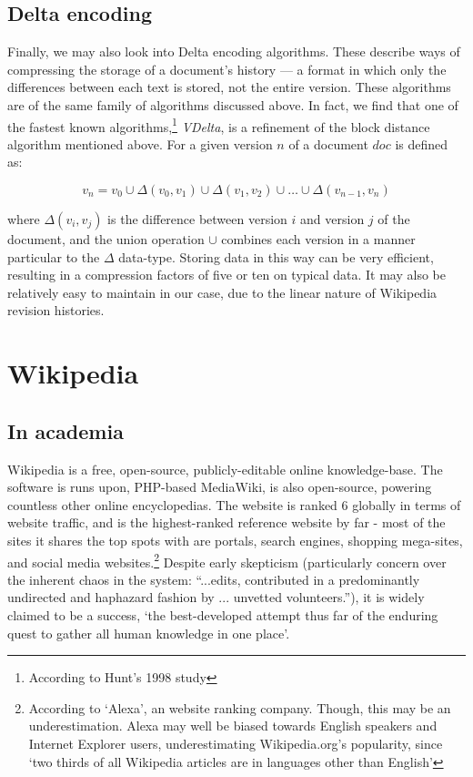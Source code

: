 \subsection*{Delta encoding}
Finally, we may also look into Delta encoding algorithms. These
describe ways of compressing the storage of a document's history --- a
format in which only the differences between each text is stored, not
the entire version. These algorithms are of the same family of
algorithms discussed above. In fact, we find that one of the fastest
known algorithms,\footnote{According to Hunt's 1998
  study\cite{Hunt1998}} \textit{VDelta}, is a refinement of the block
distance algorithm mentioned above. For a given version $n$ of a
document $doc$ is defined as:

$$v_n = v_0 \cup {\Delta}(v_0,v_1) \cup {\Delta}(v_1,v_2) \cup \dots
\cup {\Delta}(v_{n-1},v_n) $$

where ${\Delta}(v_i,v_j)$ is the difference between version $i$ and
version $j$ of the document, and the union operation $\cup$ combines
each version in a manner particular to the $\Delta$ data-type. Storing
data in this way can be very efficient, resulting in a compression
factors of five or ten on typical data.\cite{Macdonald2000} It may
also be relatively easy to maintain in our case, due to the linear
nature of Wikipedia revision histories.

\section{Wikipedia}
\subsection*{In academia}
Wikipedia is a free, open-source, publicly-editable online
knowledge-base. The software is runs upon, PHP-based MediaWiki, is
also open-source, powering countless other online encyclopedias. The
website is ranked 6 globally in terms of website traffic,
and is the highest-ranked reference website by far - most of the sites
it shares the top spots with are portals, search engines, shopping
mega-sites, and social media websites.\footnote{According to `Alexa',
  an website ranking company.\cite{Alexa-about2014} Though, this may
  be an underestimation. Alexa may well be biased towards English
  speakers and Internet Explorer users, underestimating
  Wikipedia.org's popularity, since `two thirds of all Wikipedia
  articles are in languages other than
  English'\cite{wikimedia-noteonalexa}} Despite early skepticism
(particularly concern over the inherent chaos in the system:
``...edits, contributed in a predominantly undirected and haphazard
fashion by ... unvetted volunteers.''\cite{Wilkinson2007}), it is
widely claimed to be a success, `the best-developed attempt thus far
of the enduring quest to gather all human knowledge in one
place'\cite{Mesgari2014}.

